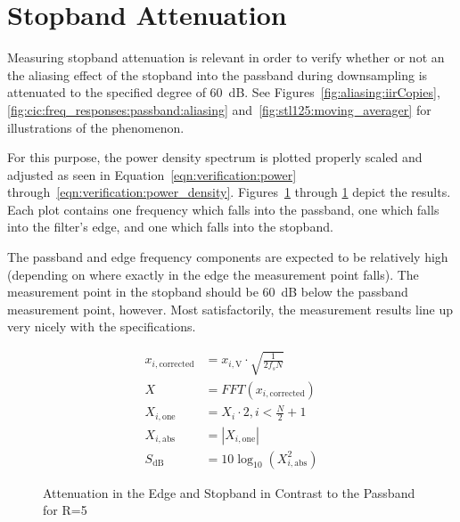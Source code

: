 \section{Stopband Attenuation} %
\label{sec:verification:snr}

Measuring stopband attenuation  is relevant in order to verify  whether or not
an the aliasing  effect of the stopband into the  passband during downsampling
is attenuated to the specified degree of \SI{60}{\dB}. See
Figures~\ref{fig:aliasing:iirCopies},
\ref{fig:cic:freq_responses:passband:aliasing}
and~\ref{fig:stl125:moving_averager} for illustrations of the phenomenon.

For this purpose,  the power density spectrum is plotted
properly scaled and adjusted  as seen in Equation~\ref{eqn:verification:power}
through~\ref{eqn:verification:power_density}. 
Figures~\ref{fig:verification:fB5}  through \ref{fig:verification:fB5}  depict
the results. Each plot  contains one frequency which falls  into the passband,
one which falls into the filter's edge, and one which falls into the stopband.

The passband and edge frequency components  are expected to be relatively high
(depending  on where  exactly in  the edge  the measurement  point falls). The
measurement point  in the stopband  should be \SI{60}{\dB} below  the passband
measurement point, however. Most satisfactorily,  the measurement results line
up very nicely with the specifications.

\begin{align}
    x_{i,\mathrm{corrected}} &= x_{i,\mathrm{V}} \cdot \sqrt{\frac{1}{2f_s N}} \label{eqn:verification:power} \\
    X                        &= FFT\left(x_{i,\mathrm{corrected}}\right)       \\
    X_{i,\mathrm{one}}       &= X_i \cdot 2, i < \frac{N}{2}+1                 \\
    X_{i,\mathrm{abs}}       &= |X_{i,\mathrm{one}}|                           \\
    S_{\si{\dB}}             &= 10\log_{10}(X_{i,\mathrm{abs}}^2)              \label{eqn:verification:power_density}
\end{align}

\begin{figure}
    \centering
    
    \caption[Attenuation in the Edge and Stopband in Contrast to the Passband for R=5]{%
    Attenuation in the Edge and Stopband in Contrast to the Passband for R=5%
    }
    \label{fig:verification:fB5}
\end{figure}

